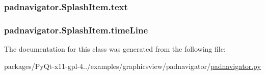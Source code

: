 \subsubsection[{text}]{\setlength{\rightskip}{0pt plus 5cm}padnavigator.\+Splash\+Item.\+text}\label{classpadnavigator_1_1SplashItem_aa8845c6194cb44557e6fd1742c151806}
\hypertarget{classpadnavigator_1_1SplashItem_a9eeb9c5c97fcab32afe76284c36b4fe8}{}
\subsubsection[{time\+Line}]{\setlength{\rightskip}{0pt plus 5cm}padnavigator.\+Splash\+Item.\+time\+Line}\label{classpadnavigator_1_1SplashItem_a9eeb9c5c97fcab32afe76284c36b4fe8}


The documentation for this class was generated from the following file\+:\begin{DoxyCompactItemize}
\item 
packages/\+Py\+Qt-\/x11-\/gpl-\/4../examples/graphicsview/padnavigator/\hyperlink{padnavigator_8py}{padnavigator.\+py}\end{DoxyCompactItemize}
